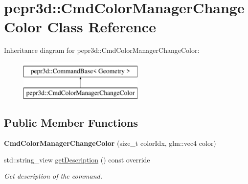 \hypertarget{classpepr3d_1_1_cmd_color_manager_change_color}{}\section{pepr3d\+::Cmd\+Color\+Manager\+Change\+Color Class Reference}
\label{classpepr3d_1_1_cmd_color_manager_change_color}
Inheritance diagram for pepr3d\+::Cmd\+Color\+Manager\+Change\+Color\+:\begin{figure}[H]
\begin{center}
\leavevmode
\includegraphics[height=2.000000cm]{classpepr3d_1_1_cmd_color_manager_change_color}
\end{center}
\end{figure}
\subsection*{Public Member Functions}
\begin{DoxyCompactItemize}
\item 
\mbox{\label{classpepr3d_1_1_cmd_color_manager_change_color_a692f6a5497446867f9dd67a05badd53b}} 
{\bfseries Cmd\+Color\+Manager\+Change\+Color} (size\+\_\+t color\+Idx, glm\+::vec4 color)
\item 
\mbox{\label{classpepr3d_1_1_cmd_color_manager_change_color_a1d7bdcdb55b06f6829d320c8262e4ff6}} 
std\+::string\+\_\+view \mbox{\hyperlink{classpepr3d_1_1_cmd_color_manager_change_color_a1d7bdcdb55b06f6829d320c8262e4ff6}{get\+Description}} () const override
\begin{DoxyCompactList}\small\item\em Get description of the command. \end{DoxyCompactList}\end{DoxyCompactItemize}
